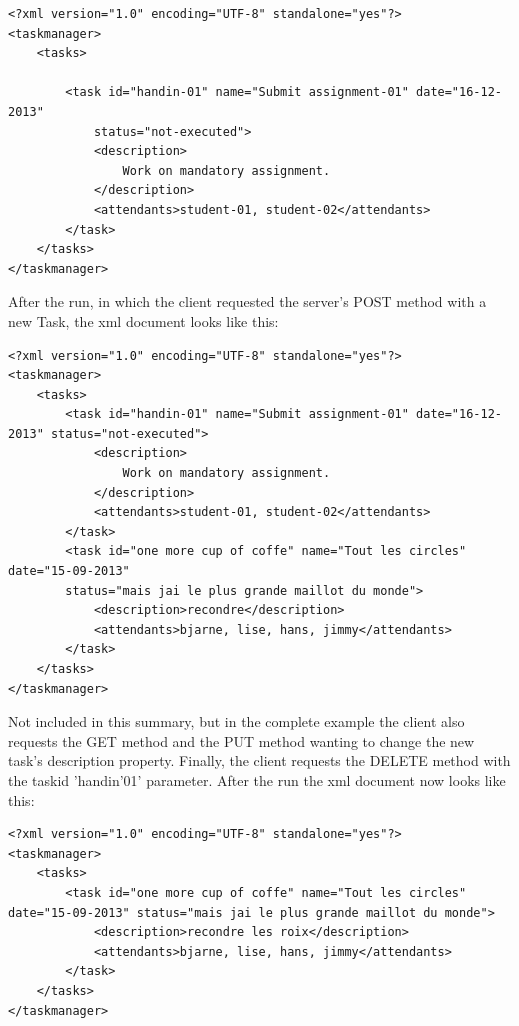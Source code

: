 \begin{lstlisting}[caption=xml before run]
<?xml version="1.0" encoding="UTF-8" standalone="yes"?>
<taskmanager>
	<tasks>
		
		<task id="handin-01" name="Submit assignment-01" date="16-12-2013"
			status="not-executed">
			<description>
				Work on mandatory assignment.
			</description>
			<attendants>student-01, student-02</attendants>
		</task>	
	</tasks>
</taskmanager>

\end{lstlisting}


After the run, in which the client requested the server's POST method with a new Task, the xml document looks like this:

\begin{lstlisting}[caption=xml after POST]
<?xml version="1.0" encoding="UTF-8" standalone="yes"?>
<taskmanager>
	<tasks>
		<task id="handin-01" name="Submit assignment-01" date="16-12-2013" status="not-executed">
			<description>
				Work on mandatory assignment.
			</description>
			<attendants>student-01, student-02</attendants>
		</task>
		<task id="one more cup of coffe" name="Tout les circles" date="15-09-2013" 
		status="mais jai le plus grande maillot du monde">
			<description>recondre</description>
			<attendants>bjarne, lise, hans, jimmy</attendants>
		</task>
	</tasks>
</taskmanager>
\end{lstlisting}

Not included in this summary, but in the complete example the client also requests the GET method and the PUT method wanting to change the new task's description property. Finally, the client requests the DELETE method with the taskid 'handin'01' parameter. After the run the xml document now looks like this:

\begin{lstlisting}[caption=xml after PUT]
<?xml version="1.0" encoding="UTF-8" standalone="yes"?>
<taskmanager>
	<tasks>
		<task id="one more cup of coffe" name="Tout les circles" date="15-09-2013" status="mais jai le plus grande maillot du monde">
			<description>recondre les roix</description>
			<attendants>bjarne, lise, hans, jimmy</attendants>
		</task>
	</tasks>
</taskmanager>
\end{lstlisting}



















